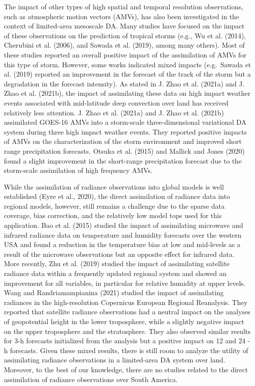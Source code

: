 \documentclass[authoryear,preprint,review,12pt]{elsarticle} %
\begin{document}
The impact of other types of high spatial and temporal resolution observations, such as atmospheric motion vectors (AMVs), has also been investigated in the context of limited-area mesoscale DA. Many studies have focused on the impact of these observations on the prediction of tropical storms (e.g., Wu et al. (2014), Cherubini et al. (2006), and Sawada et al. (2019), among many others). Most of these studies reported an overall positive impact of the assimilation of AMVs for this type of storm. However, some works indicated mixed impacts (e.g.~Sawada et al. (2019) reported an improvement in the forecast of the track of the storm but a degradation in the forecast intensity). As stated in J. Zhao et al. (2021a) and J. Zhao et al. (2021b), the impact of assimilating these data on high impact weather events associated with mid-latitude deep convection over land has received relatively less attention. J. Zhao et al. (2021a) and J. Zhao et al. (2021b) assimilated GOES-16 AMVs into a storm-scale three-dimensional variational DA system during three high impact weather events. They reported positive impacts of AMVs on the characterization of the storm environment and improved short range precipitation forecasts. Otsuka et al. (2015) and Mallick and Jones (2020) found a slight improvement in the short-range precipitation forecast due to the storm-scale assimilation of high frequency AMVs.

While the assimilation of radiance observations into global models is well established (Eyre et al., 2020), the direct assimilation of radiance data into regional models, however, still remains a challenge due to the sparse data coverage, bias correction, and the relatively low model tops used for this application. Bao et al. (2015) studied the impact of assimilating microwave and infrared radiance data on temperature and humidity forecasts over the western USA and found a reduction in the temperature bias at low and mid-levels as a result of the microwave observations but an opposite effect for infrared data. More recently, Zhu et al. (2019) studied the impact of assimilating satellite radiance data within a frequently updated regional system and showed an improvement for all variables, in particular for relative humidity at upper levels. Wang and Randriamampianina (2021) studied the impact of assimilating radiances in the high-resolution Copernicus European Regional Reanalysis. They reported that satellite radiance observations had a neutral impact on the analyses of geopotential height in the lower troposphere, while a slightly negative impact on the upper troposphere and the stratosphere. They also observed similar results for 3-h forecasts initialized from the analysis but a positive impact on 12 and 24 -h forecasts. Given these mixed results, there is still room to analyze the utility of assimilating radiance observations in a limited-area DA system over land. Moreover, to the best of our knowledge, there are no studies related to the direct assimilation of radiance observations over South America.
\end{document}
